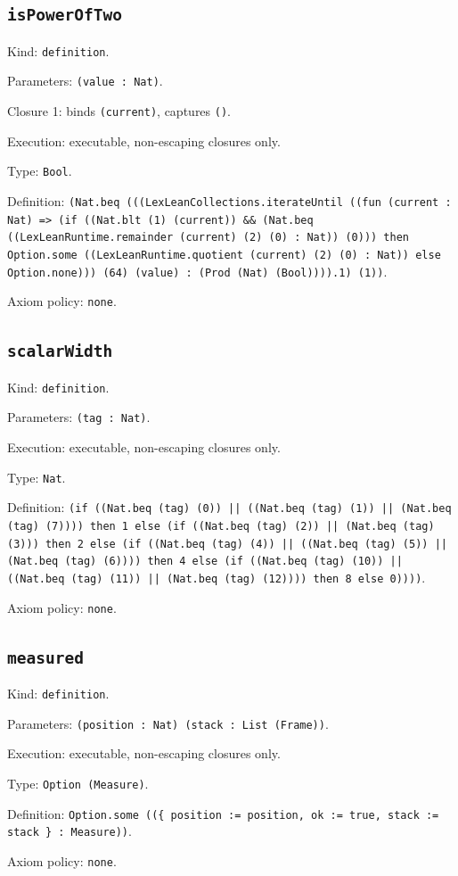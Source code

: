 \documentclass[11pt]{article}
\begin{document}
\subsection*{\texttt{isPowerOfTwo}}
\noindent Kind: \texttt{definition}.\par
\noindent Parameters: \texttt{(value : Nat)}.\par
\noindent Closure 1: binds \texttt{(current)}, captures \texttt{()}.\par
\noindent Execution: executable, non-escaping closures only.\par
\noindent Type: \texttt{Bool}.\par
\noindent Definition: \texttt{(Nat.beq (((LexLeanCollections.iterateUntil ((fun (current : Nat) => (if ((Nat.blt (1) (current)) \&\& (Nat.beq ((LexLeanRuntime.remainder (current) (2) (0) : Nat)) (0))) then Option.some ((LexLeanRuntime.quotient (current) (2) (0) : Nat)) else Option.none))) (64) (value) : (Prod (Nat) (Bool)))).1) (1))}.\par
\noindent Axiom policy: \texttt{none}.\par
\subsection*{\texttt{scalarWidth}}
\noindent Kind: \texttt{definition}.\par
\noindent Parameters: \texttt{(tag : Nat)}.\par
\noindent Execution: executable, non-escaping closures only.\par
\noindent Type: \texttt{Nat}.\par
\noindent Definition: \texttt{(if ((Nat.beq (tag) (0)) || ((Nat.beq (tag) (1)) || (Nat.beq (tag) (7)))) then 1 else (if ((Nat.beq (tag) (2)) || (Nat.beq (tag) (3))) then 2 else (if ((Nat.beq (tag) (4)) || ((Nat.beq (tag) (5)) || (Nat.beq (tag) (6)))) then 4 else (if ((Nat.beq (tag) (10)) || ((Nat.beq (tag) (11)) || (Nat.beq (tag) (12)))) then 8 else 0))))}.\par
\noindent Axiom policy: \texttt{none}.\par
\subsection*{\texttt{measured}}
\noindent Kind: \texttt{definition}.\par
\noindent Parameters: \texttt{(position : Nat) (stack : List (Frame))}.\par
\noindent Execution: executable, non-escaping closures only.\par
\noindent Type: \texttt{Option (Measure)}.\par
\noindent Definition: \texttt{Option.some ((\{ position := position, ok := true, stack := stack \} : Measure))}.\par
\noindent Axiom policy: \texttt{none}.\par
\end{document}
